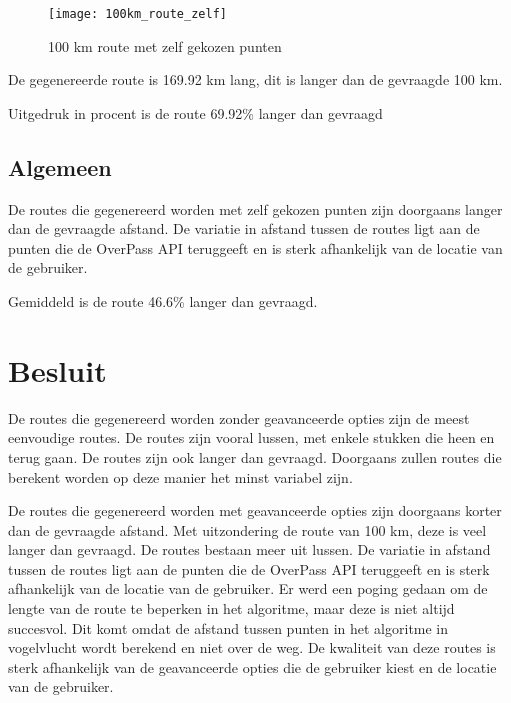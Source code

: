 \begin{figure}[H]
    \centering
    \texttt{[image: 100km\_route\_zelf]}
    \caption{100 km route met zelf gekozen punten}
    \label{fig:100km_route_zelf}

\end{figure}

De gegenereerde route is 169.92 km lang, dit is langer dan de gevraagde 100 km.

Uitgedruk in procent is de route 69.92\% langer dan gevraagd


\pagebreak

\subsection{Algemeen}

De routes die gegenereerd worden met zelf gekozen punten zijn doorgaans langer dan de gevraagde afstand. De variatie in afstand tussen de routes ligt aan de punten die de OverPass API teruggeeft en is sterk afhankelijk van de locatie van de gebruiker.

Gemiddeld is de route 46.6\% langer dan gevraagd.

\section{Besluit}

De routes die gegenereerd worden zonder geavanceerde opties zijn de meest eenvoudige routes. De routes zijn vooral lussen, met enkele stukken die heen en terug gaan. De routes zijn ook langer dan gevraagd.
Doorgaans zullen routes die berekent worden op deze manier het minst variabel zijn.

\vspace{1cm}


De routes die gegenereerd worden met geavanceerde opties zijn doorgaans korter dan de gevraagde afstand. Met uitzondering de route van 100 km, deze is veel langer dan gevraagd.
De routes bestaan meer uit lussen. De variatie in afstand tussen de routes ligt aan de punten die de OverPass API teruggeeft en is sterk afhankelijk van de locatie van de gebruiker.
Er werd een poging gedaan om de lengte van de route te beperken in het algoritme, maar deze is niet altijd succesvol. Dit komt omdat de afstand tussen punten in het algoritme in vogelvlucht wordt berekend en niet over de weg.
De kwaliteit van deze routes is sterk afhankelijk van de geavanceerde opties die de gebruiker kiest en de locatie van de gebruiker.

